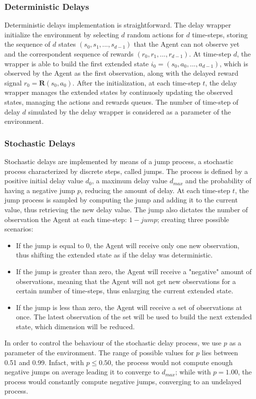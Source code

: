             \subsubsection{Deterministic Delays}
                Deterministic delays implementation is straightforward. The delay wrapper initialize the environment by selecting $d$ random actions for $d$ time-steps, storing the sequence of $d$ states $(s_0, s_1, ..., s_{d-1})$ that the Agent can not observe yet and the correspondent sequence of rewards $(r_0, r_1, ..., r_{d-1})$. At time-step $d$, the wrapper is able to build the first extended state $i_0 = (s_0, a_0, ..., a_{d-1})$, which is observed by the Agent as the first observation, along with the delayed reward signal $r_0 = \mathbf{R}(s_0, a_0)$. After the initialization, at each time-step $t$, the delay wrapper manages the extended states by continuosly updating the observed states, managing the actions and rewards queues. The number of time-step of delay $d$ simulated by the delay wrapper is considered as a parameter of the environment.
            
            \subsubsection{Stochastic Delays}
                Stochastic delays are implemented by means of a jump process, a stochastic process characterized by discrete steps, called jumps. The process is defined by a positive initial delay value $d_0$, a maximum delay value $d_{max}$ and the probability of having a negative jump $p$, reducing the amount of delay. At each time-step $t$, the jump process is sampled by computing the jump and adding it to the current value, thus retrieving the new delay value. The jump also dictates the number of observation the Agent at each time-step: $1-jump$; creating three possible scenarios:
                \begin{itemize}
                    \item If the jump is equal to 0, the Agent will receive only one new observation, thus shifting the extended state as if the delay was deterministic.
                    \item If the jump is greater than zero, the Agent will receive a "negative" amount of observations, meaning that the Agent will not get new observations for a certain number of time-steps, thus enlarging the current extended state.
                    \item If the jump is less than zero, the Agent will receive a set of observations at once. The latest observation of the set will be used to build the next extended state, which dimension will be reduced. 
                \end{itemize}
                In order to control the behaviour of the stochastic delay process, we use $p$ as a parameter of the environment. The range of possible values for $p$ lies between 0.51 and 0.99. Infact, with $p \leq 0.50$, the process would not compute enough negative jumps on average leading it to converge to $d_{max}$; while with $p = 1.00$, the process would constantly compute negative jumps, converging to an undelayed process. 
                
